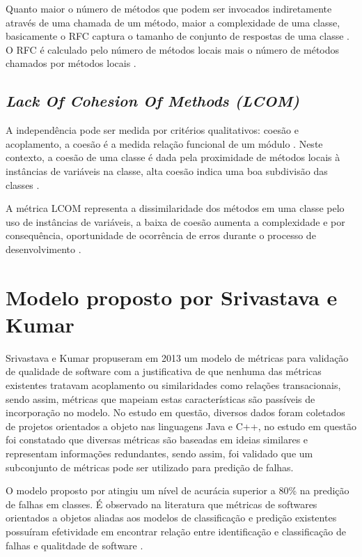 \documentclass[
	12pt,				%
	oneside,			%
	a4paper,			%
	english,			%
	brazil				%
	]{abntex2ppgsi}
\begin{document}
Quanto maior o número de métodos que podem ser invocados indiretamente através de uma chamada de um método, maior a complexidade de uma classe, basicamente o RFC captura o tamanho de conjunto de respostas de uma classe \cite{kan95}. O RFC é calculado pelo número de métodos locais mais o número de métodos chamados por métodos locais \cite{kan95}.


\subsection{\textit{Lack Of Cohesion Of Methods (LCOM)}}
A independência pode ser medida por critérios qualitativos: coesão e acoplamento, a coesão é a medida relação funcional de um módulo \cite{pressman2009engenharia}. Neste contexto, a coesão de uma classe é dada pela proximidade de métodos locais à instâncias de variáveis na classe, alta coesão indica uma boa subdivisão das classes \cite{kan95}.

A métrica LCOM representa a dissimilaridade dos métodos em uma classe pelo uso de instâncias de variáveis, a baixa de coesão aumenta a complexidade e por consequência, oportunidade de ocorrência de erros durante o processo de desenvolvimento \cite{kan95}.

\section{Modelo proposto por Srivastava e Kumar}

Srivastava e Kumar propuseram em 2013 um modelo de métricas para validação de qualidade de software com a justificativa de que nenhuma das métricas existentes tratavam acoplamento ou similaridades como relações transacionais, sendo assim, métricas que mapeiam estas características são passíveis de incorporação no modelo. No estudo em questão, diversos dados foram coletados de projetos orientados a objeto nas linguagens Java e C++, no estudo em questão foi constatado que diversas métricas são baseadas em ideias similares e representam informações redundantes, sendo assim, foi validado que um subconjunto de métricas pode ser utilizado para predição de falhas.

O modelo proposto por \cite{srivastava2013} atingiu um nível de acurácia superior a 80\% na predição de falhas em classes. É observado na literatura que métricas de softwares orientados a objetos aliadas aos modelos de classificação e predição existentes possuíram efetividade em encontrar relação entre identificação e classificação de falhas e qualitdade de software  \cite{Suresh2016}.
\end{document}
